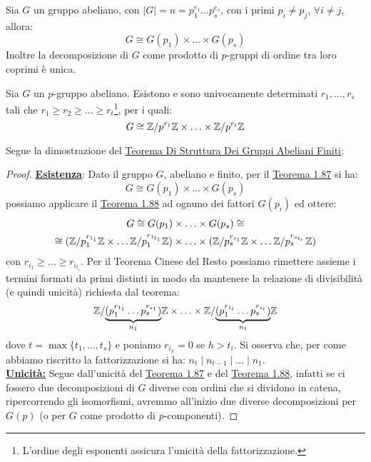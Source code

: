\documentclass[11pt]{scrartcl}
\begin{document}
\begin{theorem}
    \label{t:t1}
    Sia $G$ un gruppo abeliano, con $|G| = n = p_1^{e_1}\ldots p_s^{e_s}$, con i primi $p_i \ne p_j$, $\forall i \ne j$, allora:
        \[ G \cong G(p_1) \times \ldots \times G(p_s)
            \]
    Inoltre la decomposizione di $G$ come prodotto di $p$-gruppi di ordine tra loro coprimi è unica.
\end{theorem}

\begin{theorem}
    \label{t:t2}
    Sia $G$ un $p$-gruppo abeliano. Esistono e sono univocamente determinati $r_1,\ldots,r_s$ tali che $r_1 \geq r_2 \geq \ldots \geq r_t$\footnote{L'ordine
     degli esponenti assicura l'unicità della fattorizzazione.}, per i quali:
        \[ G \cong \mathbb{Z}/{p^{r_1}}\mathbb{Z} \times \ldots \times \mathbb{Z}/{p^{r_t}}\mathbb{Z}
            \]
\end{theorem}

\pagebreak

Segue la dimostrazione del \hyperref[t:struttura]{Teorema Di Struttura Dei Gruppi Abeliani Finiti}:

\begin{proof}
    \underline{\textbf{Esistenza}}: Dato il gruppo $G$, abeliano e finito, per il \hyperref[t:t1]{Teorema 1.87} si ha:
        \[ G \cong G(p_1) \times \ldots \times G(p_s)
            \]
    possiamo applicare il \hyperref[t:t2]{Teorema 1.88} ad ognuno dei fattori $G(p_i)$ ed ottere:
        \begin{multline*}
            G \cong G(p_1) \times \ldots \times G(p_s) \cong \\
            \cong (\mathbb{Z}/{p_1^{r_{1_1}}}\mathbb{Z} \times \ldots \mathbb{Z}/{p_1^{r_{1_{t_1}}}}\mathbb{Z}) \times \ldots \times (\mathbb{Z}/{p_s^{r_{s_1}}}\mathbb{Z} \times \ldots \mathbb{Z}/{p_s^{r_{s_{t_r}}}}\mathbb{Z})
        \end{multline*}
    con $r_{i_1} \geq \ldots \geq r_{i_{t_i}}$. Per il Teorema Cinese del Resto possiamo rimettere assieme i termini formati da primi distinti in modo da mantenere la relazione di divisibilità (e quindi unicità)
    richiesta dal teorema:
    \[ \mathbb{Z}/{\underbrace{(p_1^{r_{1_1}}\ldots p_s^{r_{s_1}})}_{n_1}}\mathbb{Z} \times \ldots \times \mathbb{Z}/{\underbrace{(p_1^{r_{1_t}}\ldots p_s^{r_{s_t}})}_{n_t}}\mathbb{Z}
        \]
    dove $t = \max\{t_1,\ldots,t_s\}$ e poniamo $r_{i_h} = 0$ se $h>t_i$. Si osserva che, per come abbiamo riscritto la fattorizzazione si ha: $n_t \mid n_{t-1} \mid \ldots \mid n_1$.\\
    \underline{\textbf{Unicità:}} Segue dall'unicità del \hyperref[t:t1]{Teorema 1.87} e del \hyperref[t:t2]{Teorema 1.88}, infatti se ci fossero due decomposizioni di 
    $G$ diverse con ordini che si dividono in catena, ripercorrendo gli isomorfismi, avremmo all'inizio due diverse decomposizioni per $G(p)$ (o per $G$ come prodotto di $p$-componenti).
\end{proof}
\end{document}
